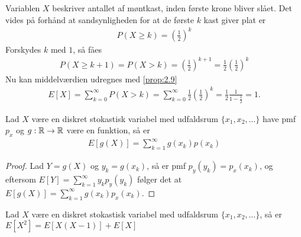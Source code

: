 \begin{exmp}
    Variablen $X$ beskriver antallet af møntkast, inden første krone bliver slået. Det vides på forhånd at sandsynligheden for at de første $k$ kast giver plat er 
    \begin{align*}
        P(X\geq k)=\left(\frac{1}{2}\right)^k
    \end{align*}
    Forskydes $k$ med $1$, så fåes
    \begin{align*}
        P(X\geq k+1)=P(X>k)=\left(\frac{1}{2}\right)^{k+1}=\frac{1}{2}\left(\frac{1}{2}\right)^k
    \end{align*}
    Nu kan middelværdien udregnes med \ref{prop:2.9} 
    \begin{align*}
        E[X]=\sum_{k=0}^\infty P(X>k)=\sum_{k=0}^\infty\frac{1}{2}\left(\frac{1}{2}\right)^k=\frac{1}{2}\frac{1}{1-\frac{1}{2}}=1.
    \end{align*}
\end{exmp}

\begin{prop} \label{prop 2.12} %
Lad $X$ være en diskret stokastisk variabel med udfaldsrum $\{x_1,x_2,\ldots\}$ have pmf $p_x$ og $g:\mathbb{R}\to \mathbb{R}$ være en funktion, så er 
\begin{align*}
    E[g(X)] = \sum_{k=1}^\infty g(x_k)p(x_k)
\end{align*}
\end{prop}
\begin{proof}
Lad $Y = g(X)$ og $y_k = g(x_k)$, så er pmf $p_y(y_k) = p_x(x_k)$, og eftersom 
$E[Y] = \sum^\infty_{k = 1} y_k p_y(y_k)$
følger det at $E[g(X)] = \sum^\infty_{k = 1} g(x_k) p_x(x_k)$.
\end{proof}

\begin{lem} \label{lem:middelværdiAfX2}
Lad $X$ være en diskret stokastisk variabel med udfaldsrum $\{x_1, x_2, \ldots\}$, så er $E[X^2] = E[X(X-1)] + E[X]$
\end{lem}

